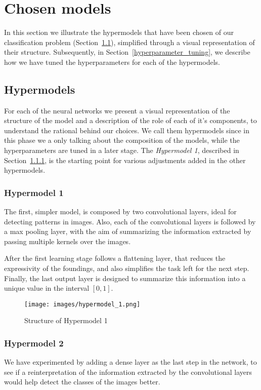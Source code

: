 \section{Chosen models}\label{2_models}
In this section we illustrate the hypermodels that have been chosen of our classification problem (Section~\ref{hypermodels}), simplified through a visual representation of their structure. Subsequently, in Section~\ref{hyperparameter_tuning}, we describe how we have tuned the hyperparameters for each of the hypermodels.

\subsection{Hypermodels}\label{hypermodels}
For each of the neural networks we present a visual representation of the structure of the model and a description of the role of each of it's components, to understand the rational behind our choices. We call them hypermodels since in this phase we a only talking about the composition of the models, while the hyperparameters are tuned in a later stage. The \textsl{Hypermodel 1}, described in Section~\ref{hypermodel_1}, is the starting point for various adjustments added in the other hypermodels.

\subsubsection{Hypermodel 1}\label{hypermodel_1}
The first, simpler model, is composed by two convolutional layers, ideal for detecting patterns in images. Also, each of the convolutional layers is followed by a max pooling layer, with the aim of summarizing the information extracted by passing multiple kernels over the images.

After the first learning stage follows a flattening layer, that reduces the expressivity of the foundings, and also simplifies the task left for the next step. Finally, the last output layer is designed to summarize this information into a unique value in the interval $\left[0,1\right]$.

\begin{figure}[h]
    \label{fig:Hypermodel_1}
    \centering
    \texttt{[image: images/hypermodel\_1.png]}
    \caption{Structure of Hypermodel 1}
\end{figure}

\subsubsection{Hypermodel 2}\label{hypermodel_2}
We have experimented by adding a dense layer as the last step in the network, to see if a reinterpretation of the information extracted by the convolutional layers would help detect the classes of the images better.

